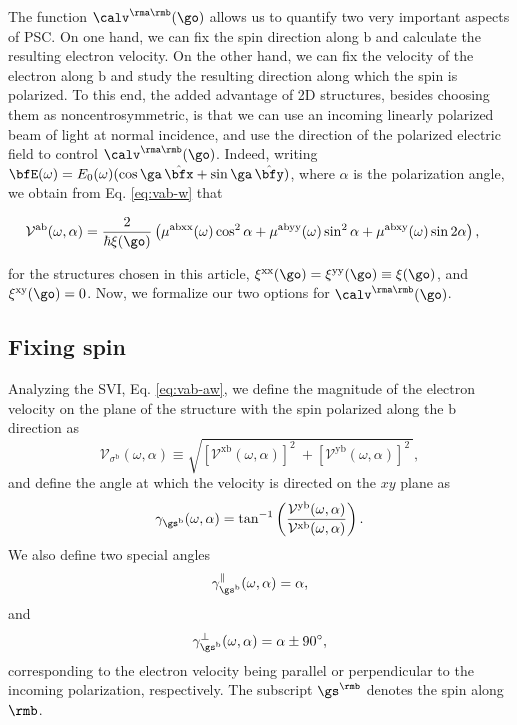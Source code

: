 \documentclass[floatfix,prb,aps,superscriptaddress,showpacs,11pt,preprint,letterpaper]{revtex4}
\begin{document}
The function $\calv^{\rma\rmb}(\go)$ allows us to quantify two very
important aspects of PSC. On one hand, we can fix the spin direction
along $\mathrm{b}$  
and calculate the resulting electron velocity.  
On the other hand, we can fix the velocity of the electron
along $\mathrm{b}$ and study the resulting direction along which the
spin is polarized.
To this end, the added advantage of  2D structures, besides choosing
them as noncentrosymmetric, is that we can use an incoming linearly
polarized beam of light
at normal incidence, and use the  direction of the polarized  electric
field to control $\calv^{\rma\rmb}(\go)$.
Indeed, writing 
$\bfE(\omega) = E_0(\omega)(\cos\ga\,\hat\bfx+\sin\ga\,\hat\bfy)$,
where $\alpha$ is the polarization angle, we obtain from
 Eq. \eqref{eq:vab-w}
that
\begin{widetext}
\begin{align}
\mathcal{V}^{\mathrm{ab}}(\omega,\alpha)
&= 
\frac{2}{\hbar\xi(\go)}
\left(\mu^{\mathrm{abxx}}(\omega)\cos^{2}\alpha + 
\mu^{\mathrm{abyy}}(\omega)\sin^{2}\alpha + 
\mu^{\mathrm{abxy}}(\omega)\sin 2\alpha\right)
,
\label{eq:vab-aw}
\end{align}
\end{widetext}
for the structures chosen in this article,
$\xi^{\mathrm{xx}}(\go)=\xi^{\mathrm{yy}}(\go)\equiv\xi(\go)$, and $\xi^{\mathrm{xy}}(\go)=0$.
Now, we formalize our two options for $\calv^{\rma\rmb}(\go)$.

\subsection{Fixing spin}\label{sec:theory-fixspin}

Analyzing the SVI, Eq. \eqref{eq:vab-aw}, we define the magnitude of
the electron velocity on the plane of the structure 
with the spin polarized along the $\mathrm{b}$ direction as
\begin{equation}
\mathcal{V}_{\sigma^{\mathrm{b}}}(\omega,\alpha)
\equiv
\sqrt{
[\mathcal{V}^{\mathrm{xb}}(\omega,\alpha)]^{2}\ +
[\mathcal{V}^{\mathrm{yb}}(\omega,\alpha)]^{2}\ 
}, 
\label{eq:vs-mag}
\end{equation}
and define the angle at which the velocity is directed on the $xy$ plane as
\begin{equation}
\gamma_{\gs^\mathrm{b}} (\omega,\alpha)
=
\tan^{-1} \left( \frac{\mathcal{V}^{\mathrm{yb}}(\omega,\alpha)}
{\mathcal{V}^{\mathrm{xb}}(\omega,\alpha)} \right)
.
\label{eq:gamma-ang}
\end{equation}
We also define two special angles
\begin{equation}
\gamma_{\gs^\mathrm{b}}^\parallel(\omega,\alpha) = \alpha, 
\label{eq:gamma-par} 
\end{equation}
and
\begin{equation}
\gamma_{\gs^\mathrm{b}}^\perp(\omega,\alpha) = \alpha \pm 90^{\circ},
\label{eq:gamma-perp}
\end{equation}
corresponding to the electron velocity being parallel or perpendicular
to the incoming polarization, 
respectively. The subscript $\gs^\rmb$ denotes the spin along $\rmb$.
\end{document}
